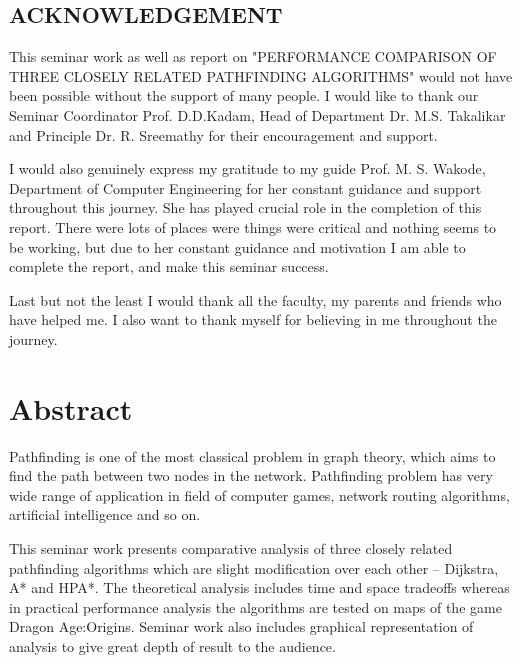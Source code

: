 \documentclass[a4paper, 12pt]{article}
\begin{document}
\begin{titlepage}
\end{titlepage} 

\begin{center}
\section*{ACKNOWLEDGEMENT}
\end{center}

\hspace{0.5cm} This seminar work as well as report on "PERFORMANCE COMPARISON OF THREE CLOSELY RELATED PATHFINDING ALGORITHMS" would not have been possible without the support of many people. I would like to thank our Seminar Coordinator Prof. D.D.Kadam, Head of Department Dr. M.S. Takalikar and Principle Dr. R. Sreemathy for their encouragement and support.
\\
\par I would also genuinely express my gratitude to my guide Prof. M. S. Wakode, Department of Computer Engineering for her constant guidance and support throughout this journey. She has played crucial role in the completion of this report. There were lots of places were things were critical and nothing seems to be working, but due to her constant guidance and motivation I am able to complete the report, and make this seminar success.
\\
\par Last but not the least I would thank all the faculty, my parents and friends who have helped me. I also want to thank myself for believing in me throughout the journey.
\par 

\newpage
\tableofcontents

\newpage
\listoftables
\listoffigures

\newpage
\section*{Abstract}
Pathfinding is one of the most classical problem in graph theory, which aims to find 
the path between two nodes in the network. Pathfinding problem has very wide range of 
application in field of computer games, network routing algorithms, artificial intelligence and so 
on. 
\\
\par
This seminar work presents comparative analysis of three closely related pathfinding 
algorithms which are slight modification over each other – Dijkstra, A* and HPA*. The 
theoretical analysis includes time and space tradeoffs whereas in practical performance analysis 
the algorithms are tested on maps of the game Dragon Age:Origins. Seminar work also includes 
graphical representation of analysis to give great depth of result to the audience.
\end{document}
